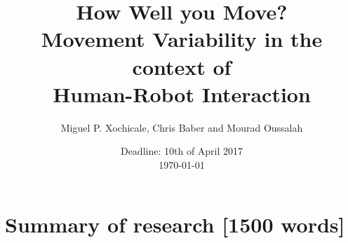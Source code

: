 \documentclass[a4paper]{article}
\title{How Well you Move? \\  Movement Variability in the context of \\ Human-Robot Interaction}
\author{Miguel P. Xochicale, Chris Baber and  Mourad Oussalah}
\date{Deadline: 10th of April 2017 \\ \today }
\begin{document}
\maketitle
\thispagestyle{fancy}


\section*{Summary of research [1500 words]}



%
%
\end{document}
